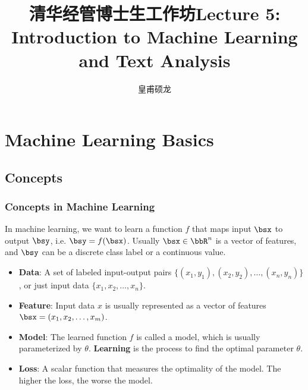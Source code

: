 \documentclass[beamer, en, version=2.0]{huangfusl-template}
\title[Lecture 5: Introduction to Machine Learning and Text Analysis]{\LARGE{清华经管博士生工作坊}\newline\newline \large{Lecture 5: Introduction to Machine Learning and Text Analysis}}
\author{皇甫硕龙}
\begin{document}
    \begin{frame}
        \maketitle
    \end{frame}

    \section{Machine Learning Basics}

    \subsection{Concepts}

    \begin{frame}
        \frametitle{Concepts in Machine Learning}

        In machine learning, we want to learn a function $f$ that maps input $\bsx$ to output $\bsy$, i.e. $\bsy = f(\bsx)$. Usually $\bsx\in \bbR^n$ is a vector of features, and $\bsy$ can be a discrete class label or a continuous value.

        \begin{itemize}
            \item \textbf{Data}: A set of labeled input-output pairs $\{(x_1, y_1), (x_2, y_2), \ldots, (x_n, y_n)\}$, or just input data $\{x_1, x_2, \ldots, x_n\}$.
            \item \textbf{Feature}: Input data $x$ is usually represented as a vector of features $\bsx = (x_1, x_2, \ldots, x_m)$.
            \item \textbf{Model}: The learned function $f$ is called a model, which is usually parameterized by $\theta$. \textbf{Learning} is the process to find the optimal parameter $\theta$.
            \item \textbf{Loss}: A scalar function that measures the optimality of the model. The higher the loss, the worse the model.
        \end{itemize}
    \end{frame}
\end{document}
